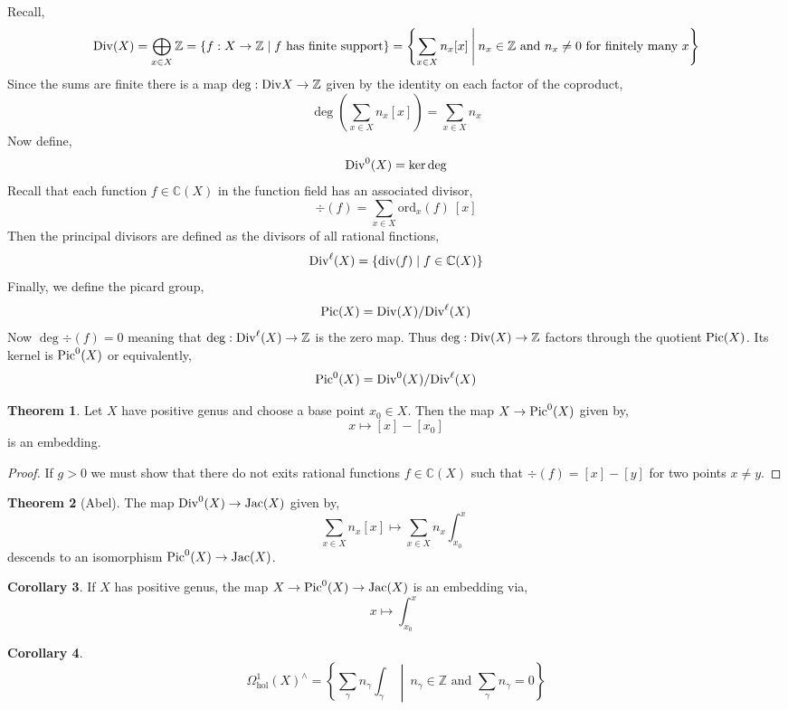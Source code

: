 \documentclass{article}
\newcommand{\Z}{\mathbb{Z}}
\newcommand{\C}{\mathbb{C}}
\theoremstyle{definition}
\newtheorem{theorem}{Theorem}[section]
\newtheorem{corollary}[theorem]{Corollary}
\newenvironment{definition}[1][Definition:]{\begin{trivlist}
\item[\hskip \labelsep {\bfseries #1}]}{\end{trivlist}}
\newcommand{\ord}{\mathrm{ord}}
\begin{document}
\begin{definition}
Recall,
\[ \Div(X) = \bigoplus_{x \in X} \Z = \left\{ f : X \to \Z \mid f \text{ has finite support} \right\} = \left\{ \sum_{x \in X} n_x [x] \: \middle| \: n_x \in \Z \text{ and } n_x \neq 0 \text{ for finitely many } x \right\} \]
Since the sums are finite there is a map $\deg : \Div{X} \to \Z$ given by the identity on each factor of the coproduct,
\[ \deg{\left( \sum_{x \in X} n_x [x] \right)} = \sum_{x \in X} n_x \]
Now define,
\[ \mathrm{Div}^0(X) = \ker{\deg} \]
Recall that each function $f \in \C(X)$ in the function field has an associated divisor,
\[ \div{(f)} = \sum_{x \in X} \ord_x(f) \: [x] \]
Then the principal divisors are defined as the divisors of all rational finctions,
\[ \Div^{\ell}(X) = \{ \div{(f)} \mid f \in \C(X) \} \]
Finally, we define the picard group,
\[ \mathrm{Pic}(X) = \mathrm{Div}(X) / \mathrm{Div}^\ell(X) \]
Now $\deg{\div{(f)}} = 0$ meaning that $\deg : \Div^\ell(X) \to \Z$ is the zero map. Thus $\deg : \Div(X) \to \Z$ factors through the quotient $\mathrm{Pic}(X)$. Its kernel is $\mathrm{Pic}^0(X)$ or equivalently,
\[ \mathrm{Pic}^0(X) = \mathrm{Div}^0(X) / \mathrm{Div}^{\ell}(X) \]
\end{definition}

\begin{theorem}
Let $X$ have positive genus and choose a base point $x_0 \in X$. Then the map $X \to \mathrm{Pic}^0(X)$ given by,
\[ x \mapsto [x] - [x_0] \]
is an embedding. 
\end{theorem}

\begin{proof}
If $g > 0$ we must show that there do not exits rational functions $f \in \C(X)$ such that $\div{(f)} = [x] - [y]$ for two points $x \neq y$. 
\end{proof}

\begin{theorem}[Abel]
The map $\mathrm{Div}^0(X) \to \mathrm{Jac}(X)$ given by,
\[ \sum_{x \in X} n_x [x] \mapsto \sum_{x \in X} n_x \int_{x_0}^x \]
descends to an isomorphism $\mathrm{Pic}^0(X) \to \mathrm{Jac}(X)$. 
\end{theorem}

\begin{corollary}
If $X$ has positive genus, the map $X \to \mathrm{Pic}^0(X) \to \mathrm{Jac}(X)$ is an embedding via,
\[ x \mapsto \int_{x_0}^x \]
\end{corollary}

\begin{corollary}
\[ \Omega^1_{\text{hol}}(X)^\wedge = \left\{ \sum_{\gamma} n_\gamma \int_\gamma \: \middle| \: n_\gamma \in \Z \text{ and } \sum_{\gamma} n_\gamma = 0 \right\} \]
\end{corollary}
\end{document}
